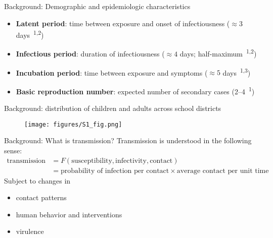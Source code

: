 \documentclass[8pt]{beamer}
\begin{document}
\begin{frame}{Background: Demographic and epidemiologic characteristics}
\begin{itemize}
    \item {\bf Latent period}: time between exposure and onset of infectiousness ($\approx 3$ days~\textsuperscript{1,2})
    \item {\bf Infectious period}: duration of infectiousness ($\approx 4$ days; half-maximum~\textsuperscript{1,2})
    \item {\bf Incubation period}: time between exposure and symptoms ($\approx 5$ days~\textsuperscript{1,3})
    \item {\bf Basic reproduction number}: expected number of secondary cases (2--4~\textsuperscript{1})
\end{itemize}

\end{frame}

\begin{frame}{Background: distribution of children and adults across school districts}
%
\begin{figure}
    \centering
    \texttt{[image: figures/S1\_fig.png]}
\end{figure}
\end{frame}

\begin{frame}{Background: What is transmission?}
%
Transmission is understood in the following sense:
\begin{align*}
    \text{transmission}
    &= F(\text{susceptibility}, \text{infectivity}, \text{contact}) \\
    &= \text{probability of infection per contact} \times \text{average contact per unit time} 
\end{align*}
%
Subject to changes in
\begin{itemize}
    \item contact patterns
    \item human behavior and interventions
    \item virulence
\end{itemize}
\end{frame}
\end{document}
